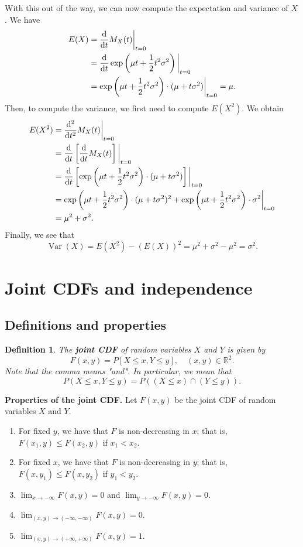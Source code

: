 \documentclass[10pt]{article}
\newcommand{\R}{\mathbb{R}}
\DeclareMathOperator{\Var}{Var}
\theoremstyle{newstyle}
\newtheorem{defn}[thm]{Definition}
\begin{document}
With this out of the way, we can now compute the expectation and variance of $X$. We have 
\begin{align*}
    E(X) &= \frac{{\rm d}}{{\rm d}t} M_X(t) \bigg|_{t=0} \\
    &= \frac{{\rm d}}{{\rm d}t} \exp \left( \mu t + \frac12 t^2 \sigma^2 \right) \bigg|_{t=0} \\
    &= \exp \left( \mu t + \frac12 t^2 \sigma^2 \right) \cdot (\mu + t\sigma^2) \bigg|_{t=0} 
    = \mu.
\end{align*}
Then, to compute the variance, we first need to compute $E(X^2)$. We obtain 
\begin{align*}
    E(X^2) &= \frac{{\rm d^2}}{{\rm d}t^2} M_X(t) \bigg|_{t=0} \\
    &= \frac{{\rm d}}{{\rm d}t} \left[ \frac{{\rm d}}{{\rm d}t} M_X(t) \right] \bigg|_{t=0} \\
    &= \frac{{\rm d}}{{\rm d}t} \left[ \exp\left(\mu t + \frac12 t^2\sigma^2 \right) 
    \cdot (\mu + t\sigma^2) \right] \bigg|_{t=0} \\
    &= \exp\left(\mu t + \frac12 t^2\sigma^2 \right) 
    \cdot (\mu + t\sigma^2)^2 + \exp\left(\mu t + \frac12 t^2\sigma^2 \right) 
    \cdot \sigma^2 \bigg|_{t=0} \\
    &= \mu^2 + \sigma^2.
\end{align*}
Finally, we see that 
\[ \Var(X) = E(X^2) - (E(X))^2 = \mu^2 + \sigma^2 - \mu^2 = \sigma^2. \]

\newpage
\section{Joint CDFs and independence}

\subsection{Definitions and properties}

\begin{defn}
The {\bf joint CDF} of random variables $X$ and $Y$ is given by 
\[ F(x, y) = P[X \leq x, Y \leq y], \quad (x, y) \in \R^2. \]
Note that the comma means "and". In particular, we mean that
\[ P(X \leq x, Y \leq y) = P((X \leq x) \cap (Y \leq y)). \]
\end{defn}

{\bf Properties of the joint CDF.} Let $F(x, y)$ be the joint CDF of random variables $X$ and $Y$. 
\begin{enumerate}[(1)]
    \item For fixed $y$, we have that $F$ is non-decreasing in $x$; that is, $F(x_1, y) \leq 
    F(x_2, y)$ if $x_1 < x_2$.
    \item For fixed $x$, we have that $F$ is non-decreasing in $y$; that is, $F(x, y_1) \leq 
    F(x, y_2)$ if $y_1 < y_2$. 
    \item $\lim_{x\to-\infty} F(x, y) = 0$ and $\lim_{y\to-\infty} F(x, y) = 0$. 
    \item $\lim_{(x,y)\to(-\infty,-\infty)} F(x, y) = 0$.
    \item $\lim_{(x,y)\to(+\infty,+\infty)} F(x, y) = 1$.
\end{enumerate}
\end{document}
